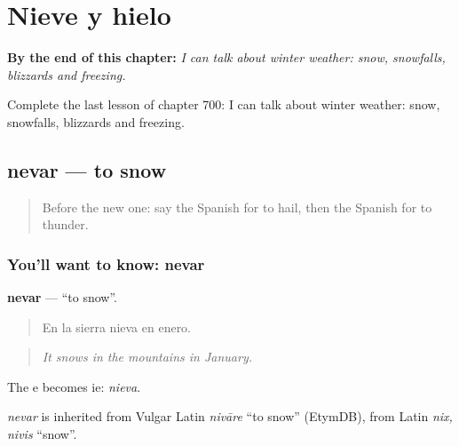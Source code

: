 
\chapter{Nieve y hielo}
\label{ch:es-nieve-y-hielo}

\begin{chapteropening}
\textbf{By the end of this chapter:} \emph{I can talk about winter weather: snow, snowfalls, blizzards and freezing.}

Complete the last lesson of chapter 700: I can talk about winter weather: snow, snowfalls, blizzards and freezing.
\end{chapteropening}

\section[nevar]{nevar — to snow}

\label{lesson:ES-C700-nevar}



\begin{quote}
Before the new one: say the Spanish for to hail, then the Spanish for to thunder.
\end{quote}

\subsection*{You'll want to know: nevar}
\textbf{nevar} — \textquotedblleft{}to snow\textquotedblright{}.

\begin{quote}
En la sierra nieva en enero.
\end{quote}

\begin{quote}
\emph{It snows in the mountains in January.}
\end{quote}

The e becomes ie: \emph{nieva}.

\begin{cousinweb}
\emph{nevar} is inherited from Vulgar Latin \emph{nivāre} \textquotedblleft{}to snow\textquotedblright{} (EtymDB), from Latin \emph{nix, nivis} \textquotedblleft{}snow\textquotedblright{}.
\end{cousinweb}

